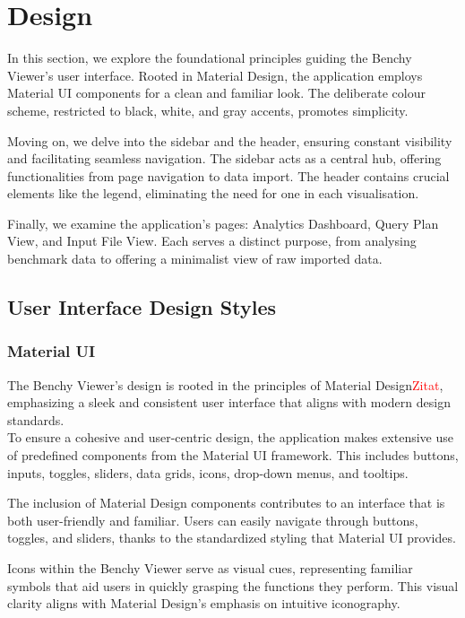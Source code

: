 
\section{Design}
In this section, we explore the foundational principles guiding the Benchy Viewer's user interface. Rooted in Material Design, the application employs Material UI components for a clean and familiar look. The deliberate colour scheme, restricted to black, white, and gray accents, promotes simplicity.

Moving on, we delve into the sidebar and the header, ensuring constant visibility and facilitating seamless navigation. The sidebar acts as a central hub, offering functionalities from page navigation to data import. The header contains crucial elements like the legend, eliminating the need for one in each visualisation.

Finally, we examine the application's pages: Analytics Dashboard, Query Plan View, and Input File View. Each serves a distinct purpose, from analysing benchmark data to offering a minimalist view of raw imported data. 


\subsection{User Interface Design Styles}
\subsubsection{Material UI}
The Benchy Viewer's design is rooted in the principles of Material Design\textcolor{red}{Zitat}, emphasizing a sleek and consistent user interface that aligns with modern design standards.\\
To ensure a cohesive and user-centric design, the application makes extensive use of predefined components from the Material UI framework. This includes buttons, inputs, toggles, sliders, data grids, icons, drop-down menus, and tooltips.

The inclusion of Material Design components contributes to an interface that is both user-friendly and familiar. Users can easily navigate through buttons, toggles, and sliders, thanks to the standardized styling that Material UI provides.

Icons within the Benchy Viewer serve as visual cues, representing familiar symbols that aid users in quickly grasping the functions they perform. This visual clarity aligns with Material Design's emphasis on intuitive iconography.

